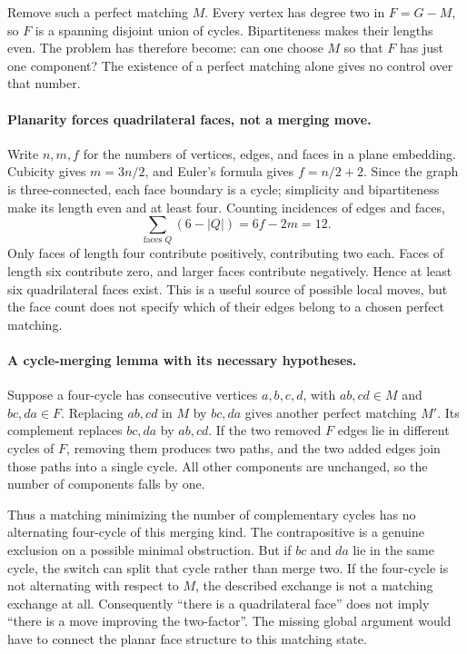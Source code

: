 \documentclass[11pt,a4paper]{article}
\begin{document}
Remove such a perfect matching $M$. Every vertex has degree two in
$F=G-M$, so $F$ is a spanning disjoint union of cycles. Bipartiteness
makes their lengths even. The problem has therefore become: can one
choose $M$ so that $F$ has just one component? The existence of a
perfect matching alone gives no control over that number.

\paragraph{Planarity forces quadrilateral faces, not a merging move.}
Write $n,m,f$ for the numbers of vertices, edges, and faces in a plane
embedding. Cubicity gives $m=3n/2$, and Euler's formula gives
$f=n/2+2$. Since the graph is three-connected, each face boundary is
a cycle; simplicity and bipartiteness make its length even and at
least four. Counting incidences of edges and faces,
\[
       \sum_{\text{faces }Q}(6-|Q|)=6f-2m=12.
\]
Only faces of length four contribute positively, contributing two
each. Faces of length six contribute zero, and larger faces contribute
negatively. Hence at least six quadrilateral faces exist. This is a
useful source of possible local moves, but the face count does not
specify which of their edges belong to a chosen perfect matching.

\paragraph{A cycle-merging lemma with its necessary hypotheses.}
Suppose a four-cycle has consecutive vertices $a,b,c,d$, with
$ab,cd\in M$ and $bc,da\in F$. Replacing $ab,cd$ in $M$ by
$bc,da$ gives another perfect matching $M'$. Its complement replaces
$bc,da$ by $ab,cd$. If the two removed $F$ edges lie in different
cycles of $F$, removing them produces two paths, and the two added
edges join those paths into a single cycle. All other components are
unchanged, so the number of components falls by one.

Thus a matching minimizing the number of complementary cycles has
no alternating four-cycle of this merging kind. The contrapositive is
a genuine exclusion on a possible minimal obstruction. But if $bc$
and $da$ lie in the same cycle, the switch can split that cycle rather
than merge two. If the four-cycle is not alternating with respect to
$M$, the described exchange is not a matching exchange at all.
Consequently ``there is a quadrilateral face'' does not imply ``there
is a move improving the two-factor''. The missing global argument
would have to connect the planar face structure to this matching state.
\end{document}
